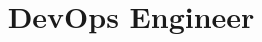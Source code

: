 \documentclass[11pt, a4paper, sans, final]{moderncv}
\title{DevOps Engineer}
\begin{document}
\maketitle





%

\emptysection{}\closesection{}
\vfill

\end{document}
